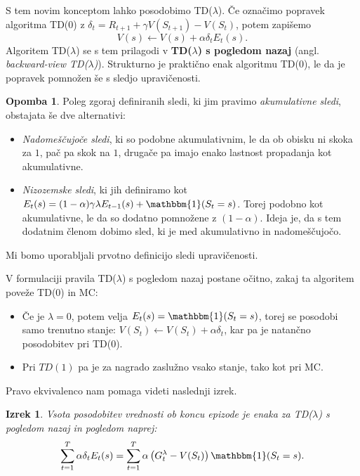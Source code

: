 \documentclass[12pt,a4paper]{amsart}
\theoremstyle{definition} %
\newtheorem{opomba}[definicija]{Opomba}
\theoremstyle{plain} %
\newtheorem{izrek}[definicija]{Izrek}
\begin{document}
S tem novim konceptom lahko posodobimo TD($\lambda$). Če označimo popravek algoritma TD($0$) z 
$\delta_t = R_{t+1} + \gamma V(S_{t+1}) - V(S_t)$, potem zapišemo
\begin{equation}\label{TDlambda}
    V(s) \leftarrow V(s) + \alpha \delta_t E_t(s).
\end{equation}
Algoritem TD($\lambda$) se s tem prilagodi v \textbf{TD($\lambda$) s pogledom nazaj} (angl. 
\textit{backward-view TD($\lambda$)}). Strukturno je praktično enak algoritmu TD($0$), le da je 
popravek pomnožen še s sledjo upravičenosti.

\begin{opomba}
    Poleg zgoraj definiranih sledi, ki jim pravimo \textit{akumulativne sledi}, obstajata še dve 
    alternativi:
    \begin{itemize}
        \item \textit{Nadomeščujoče sledi}, ki so podobne akumulativnim, le da ob obisku ni skoka za 
                $1$, pač pa skok na $1$, drugače pa imajo enako lastnost propadanja kot akumulativne. 
        \item \textit{Nizozemske sledi}, ki jih definiramo kot $E_t(s) = (1 - \alpha) \gamma \lambda 
                E_{t-1}(s) + \mathbbm{1}(S_t = s)$. Torej podobno kot akumulativne, le da so dodatno 
                pomnožene z $(1 - \alpha)$. Ideja je, da s tem dodatnim členom dobimo sled, ki je med 
                akumulativno in nadomeščujočo.
    \end{itemize}
    Mi bomo uporabljali prvotno definicijo sledi upravičenosti. 
\end{opomba}

V formulaciji pravila TD($\lambda$) s pogledom nazaj postane očitno, zakaj ta algoritem poveže TD($0$) 
in MC:

\begin{itemize}
    \item Če je $\lambda = 0$, potem velja $E_t(s) = \mathbbm{1}(S_t = s)$, torej se posodobi samo
            trenutno stanje: $V(S_t) \leftarrow V(S_t) + \alpha \delta_t$, kar pa je natančno 
            posodobitev pri TD($0$).
    \item Pri $TD(1)$ pa je za nagrado zaslužno vsako stanje, tako kot pri MC. 
\end{itemize}
Pravo ekvivalenco nam pomaga videti naslednji izrek.

\begin{izrek}
    Vsota posodobitev vrednosti ob koncu epizode je enaka za TD($\lambda$) s pogledom nazaj in 
    pogledom naprej:
    $$
    \sum_{t=1}^T \alpha \delta_t E_t(s) = \sum_{t=1}^T \alpha \left( G_t^\lambda - V(S_t) \right) 
    \mathbbm{1}(S_t = s).
    $$
\end{izrek}
\end{document}
